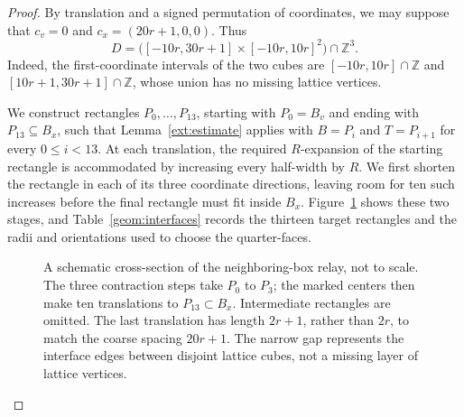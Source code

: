 \documentclass[11pt]{article}
\theoremstyle{definition}
\theoremstyle{remark}
\numberwithin{equation}{section}
\begin{document}
\begin{proof}
By translation and a signed permutation of coordinates, we may suppose that
$c_v=0$ and $c_x=(20r+1,0,0)$. Thus
\begin{equation}\label{geom:prism}
  D=\bigl([-10r,30r+1]\times[-10r,10r]^2\bigr)\cap\mathbb Z^3.
\end{equation}
Indeed, the first-coordinate intervals of the two cubes are
$[-10r,10r]\cap\mathbb Z$ and $[10r+1,30r+1]\cap\mathbb Z$, whose union has
no missing lattice vertices.

We construct rectangles $P_0,\ldots,P_{13}$, starting with $P_0=B_v$ and
ending with $P_{13}\subseteq B_x$, such that
Lemma~\ref{ext:estimate} applies with $B=P_i$ and $T=P_{i+1}$ for every
$0\le i<13$. At each translation, the required $R$-expansion of the starting
rectangle is accommodated by increasing every half-width by $R$.
We first shorten the rectangle in each of its three coordinate directions,
leaving room for ten such increases before the final rectangle must fit
inside $B_x$. Figure~\ref{geom:figure} shows these two stages, and
Table~\ref{geom:interfaces} records the thirteen target rectangles and
the radii and orientations used to choose the quarter-faces.

\begin{figure}[tbp]
\centering
{}
\caption{A schematic cross-section of the neighboring-box relay, not to scale.
The three contraction steps take $P_0$ to $P_3$; the marked centers then make
ten translations to $P_{13}\subset B_x$. Intermediate rectangles are omitted.
The last translation has length $2r+1$, rather than $2r$, to match the coarse
spacing $20r+1$. The narrow gap represents the interface edges between disjoint
lattice cubes, not a missing layer of lattice vertices.}
\label{geom:figure}
\end{figure}


\end{proof}
\end{document}
